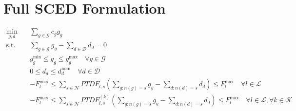 \documentclass[11pt]{article}
\begin{document}
\newpage

\section*{Full SCED Formulation}

\begin{align}
\min_{g,d} \quad
& \sum_{g \in \mathcal{G}} c_g g_g
\\[6pt]
\text{s.t.} \quad
& \sum_{g \in \mathcal{G}} g_g
-
\sum_{d \in \mathcal{D}} d_d
= 0
\\[6pt]
& g_g^{\min} \le g_g \le g_g^{\max}
\quad \forall g \in \mathcal{G}
\\[6pt]
& 0 \le d_d \le d_d^{\text{nom}}
\quad \forall d \in \mathcal{D}
\\[6pt]
& -F_l^{\max}
\le
\sum_{s \in \mathcal{N}} PTDF_{l,s}
\left(
\sum_{g: n(g)=s} g_g
-
\sum_{d: n(d)=s} d_d
\right)
\le
F_l^{\max}
\quad \forall l \in \mathcal{L}
\\[6pt]
& -F_l^{\max}
\le
\sum_{s \in \mathcal{N}} PTDF_{l,s}^{(k)}
\left(
\sum_{g: n(g)=s} g_g
-
\sum_{d: n(d)=s} d_d
\right)
\le
F_l^{\max}
\quad \forall l \in \mathcal{L}, \forall k \in \mathcal{K}
\end{align}
\end{document}
